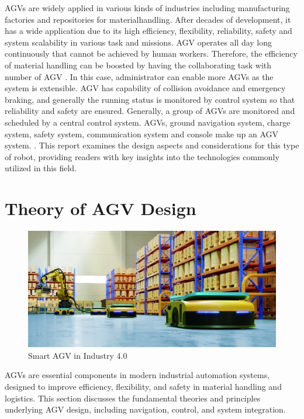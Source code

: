 \documentclass[a4paper,12pt]{extreport}
\begin{document}
AGVs are widely applied in various kinds
of industries including manufacturing
factories and repositories for materialhandling.
After decades of development, it
has a wide application due to its high
efficiency, flexibility, reliability, safety and
system scalability in various task and
missions.
AGV operates all day long continuously
that cannot be achieved by human workers.
Therefore, the efficiency of material
handling can be boosted by having the
collaborating task with number of AGV
. In this case, administrator can enable
more AGVs as the system is extensible.
AGV has capability of collision avoidance
and emergency braking, and generally the
running status is monitored by control
system so that reliability and safety are
ensured. Generally, a group of AGVs are
monitored and scheduled by a central
control system. AGVs, ground navigation
system, charge system, safety system,
communication system and console make
up an AGV system. \cite{shengfang2006research}. This report examines the design aspects and considerations for this type of robot, providing readers with key insights into the technologies commonly utilized in this field. 


\newpage
\chapter{Theory of AGV Design}
\begin{figure}[h]
    \centering
\includegraphics[width=\textwidth]{doc/smart_agv.jpg}
\caption{Smart AGV in Industry 4.0}
\end{figure}
AGVs are essential components in modern industrial automation systems, designed to improve efficiency, flexibility, and safety in material handling and logistics. This section discusses the fundamental theories and principles underlying AGV design, including navigation, control, and system integration.
\end{document}
